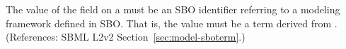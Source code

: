 The value of the  field on a \Model must be an SBO
identifier referring to a modeling framework defined in SBO.  That is, the
value must be a term derived from \sboframework.  (References: SBML L2v2
Section~\ref{sec:model-sboterm}.)
